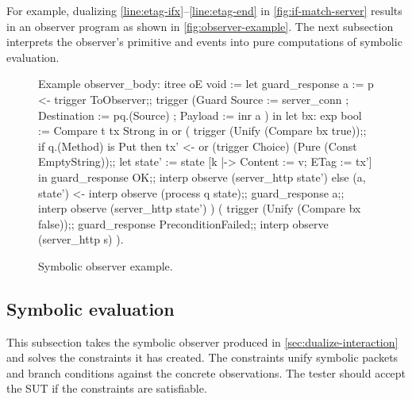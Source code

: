 For example, dualizing \autoref{line:etag-ifx}--\ref{line:etag-end} in
\autoref{fig:if-match-server} results in an observer program as shown in
\autoref{fig:observer-example}.  The next subsection interprets the observer's
primitive  and  events into pure computations of symbolic
evaluation.

\begin{figure}
\begin{coq}
  Example observer_body: itree oE void :=
    let guard_response a :=
      p <- trigger ToObserver;;
      trigger (Guard { Source      := server_conn
                     ; Destination := pq.(Source)
                     ; Payload     := inr a } ) in
    let bx: exp bool := Compare t tx Strong in
    or (
        trigger (Unify (Compare bx true));;
        if q.(Method) is Put
        then
          tx' <- or (trigger Choice)
                    (Pure (Const EmptyString));;
          let state' := state [k |-> {Content := v; ETag := tx'}] in
          guard_response OK;;
          interp observe (server_http state')
        else
          (a, state') <- interp observe (process q state);;
          guard_response a;;
          interp observe (server_http state')
       )
       (
        trigger (Unify (Compare bx false));;
        guard_response PreconditionFailed;;
        interp observe (server_http s)
       ).
\end{coq}
\caption{Symbolic observer example.}
\label{fig:observer-example}
\end{figure}


\subsection{Symbolic evaluation}
\label{sec:symbolic-eval}
This subsection takes the symbolic observer produced in
\autoref{sec:dualize-interaction} and solves the constraints it has created.
The constraints unify symbolic packets and branch conditions against the
concrete observations.  The tester should accept the SUT if the constraints are
satisfiable.

